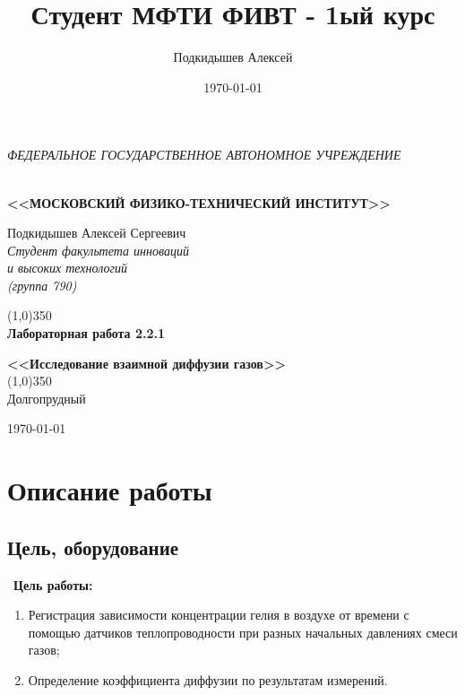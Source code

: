 \documentclass[a4paper,12pt]{article}
\author{Подкидышев Алексей}
\title{Студент МФТИ ФИВТ - 1ый курс}
\date{\today}
\theoremstyle{plain} %
\theoremstyle{definition} %
\theoremstyle{remark} %
\renewcommand{\headrulewidth}{0mm}  %
\begin{document}
\begin{titlepage}


\begin{center}
	\textit{\MakeTextUppercase{федеральное государственное автономное учреждение}}
		
	\vspace{0.5ex}
	
	\textbf{ \\ \MakeTextUppercase{<<Московский Физико-технический институт>>}}
\end{center}
\vspace{13ex}
\begin{flushright}
	\noindent
	{Подкидышев Алексей Сергеевич}
	\\
	\textit{Студент факультета инноваций\\ и высоких технологий\\(группа 790)}
\end{flushright}
\begin{center}
	\vspace{23ex}
	\line(1,0){350}\\[4ex]
	{\LARGE\textbf{Лабораторная работа 2.2.1}}
	\vspace{2ex}
	
		
	\textbf{\large{<<Исследование взаимной диффузии газов>>}}\\[3ex]
	\line(1,0){350}\\[5ex]
	\vfill
	Долгопрудный 
	
	{\today}
\end{center}

\end{titlepage}
\renewcommand{\headrulewidth}{0.7pt}

\section{Описание работы}
\subsection{Цель, оборудование}\
\noindent \textbf{Цель работы:} 

\begin{enumerate}

\item Регистрация  зависимости  концентрации   гелия в воздухе от времени с помощью датчиков теплопроводности при разных начальных давлениях смеси газов;
\item Определение коэффициента диффузии по результатам измерений.

\end{enumerate}
\end{document}
